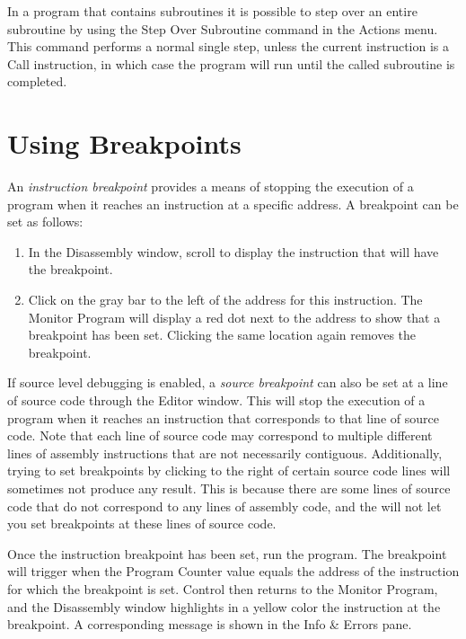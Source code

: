 \documentclass[11pt, twoside, pdftex]{article}
\begin{document}
In a program that contains subroutines it is possible to step
over an entire subroutine by using the
{\sf Step Over Subroutine} command in the {\sf Actions} menu.
This command performs a normal single step, unless the current
instruction is a Call instruction, in which case the program will
run until the called subroutine is completed.


\section{Using Breakpoints}

An {\it instruction breakpoint} provides a means of stopping the
execution of a program when it reaches an instruction at a
specific address.  A breakpoint can be set as follows:

\begin{enumerate}
\item In the Disassembly window, scroll to display the instruction that will have the breakpoint. 

\item Click on the gray bar to the left of the address
for this instruction. 
The Monitor Program will display a red dot next to the address
to show that a breakpoint has been set. 
Clicking the same location again removes the breakpoint.
\end{enumerate}

If source level debugging is enabled, a {\it source breakpoint} can also be set
at a line of source code through the {\sf Editor} window. This will stop
the execution of a program when it reaches an instruction that corresponds
to that line of source code. Note that each line of source code may correspond
to multiple different lines of assembly instructions that are not necessarily contiguous.
Additionally, trying to set breakpoints by clicking to the right of certain
source code lines will sometimes not produce any result. This is because there are some lines of 
source code that do not correspond to any lines of assembly code, and the {\productNameMed}
will not let you set breakpoints at these lines of source code.

Once the instruction breakpoint has been set, run the program.
The breakpoint will trigger when the Program Counter value equals
the address of the instruction for which the breakpoint is set.
Control then returns to the Monitor Program,
and the Disassembly window highlights in a yellow color the
instruction at the breakpoint. A corresponding message is shown
in the {\sf Info \& Errors} pane.
\end{document}
